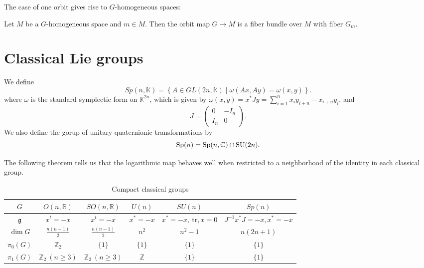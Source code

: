 \documentclass{report}
\begin{document}
The case of one orbit gives rise to $G$-homogeneous spaces:
\begin{theorem}
    Let $M$ be a $G$-homogeneous space and $m \in M$.
    Then the orbit map $G \to M$ is a fiber bundle over $M$ with fiber $G_m$.
\end{theorem}

\section{Classical Lie groups}

\begin{definition}
    We define
    \[
    Sp(n, \mathbb K) = 
    \left\{
        A \in GL(2n, \mathbb K) \mid \omega(Ax, Ay) = \omega(x, y)
    \right\}.
    \]
    where $\omega$ is the standard symplectic form on $\mathbb K^{2n}$, which is given by
    $\omega(x, y) = x^* J y = \sum_{i=1}^n x_i y_{i+n} - x_{i+n}y_i$, 
    and 
    \[
    J = 
    \begin{pmatrix}
    0 & -I_n \\
    I_n & 0
    \end{pmatrix}.
    \]
    We also define the gorup of unitary quaternionic transformations by
    \[
    \operatorname{{\mathrm{Sp}}}(n) = \operatorname{{\mathrm{Sp}}}(n, \mathbb C) \cap \operatorname{{\mathrm{SU}}}(2n).
    \]
\end{definition}

The following theorem tells us that the logarithmic map behaves well when restricted to a neighborhood of the identity in each classical group.

\begin{table}[h!]
    \centering
    \begin{tabular}{c c c c c c}
        $G$ & $O(n, \mathbb{R})$ & $SO(n, \mathbb{R})$ & $U(n)$ & $SU(n)$ & $Sp(n)$ \\
        \hline \hline
        $\mathfrak{g}$ & $x^t = -x$ & $x^t = -x$ & $x^* = -x$ & $x^* = -x, \ \text{tr}, x = 0$ & $J^{-1}x^*J = -x, x^* = -x$ \\
        $\dim G$ & $\frac{n(n-1)}{2}$ & $\frac{n(n-1)}{2}$ & $n^2$ & $n^2 - 1$ & $n(2n+1)$ \\
        $\pi_0(G)$ & $\mathbb{Z}_2$ & $\{1\}$ & $\{1\}$ & $\{1\}$ & $\{1\}$ \\
        $\pi_1(G)$ & $\mathbb{Z}_2 \ (n \ge 3)$ & $\mathbb{Z}_2 \ (n \ge 3)$ & $\mathbb{Z}$ & $\{1\}$ & $\{1\}$ \\
    \end{tabular}
    \caption{Compact classical groups}
    \label{table:classical_groups}
\end{table}
\end{document}
